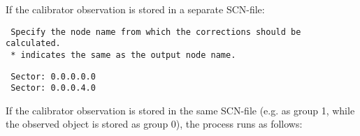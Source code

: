 If the calibrator observation is stored in a separate SCN-file:

\spbegin %
\spend %
%
\spbegin %
\spend %
%
\spbegin %
\suser{\scr}
\spend %
%
\spbegin %
\spend %
%
\spbegin %
\sdefault{= *:}
\svbegin \begin{verbatim}
 Specify the node name from which the corrections should be calculated.
 * indicates the same as the output node name.
\end{verbatim}\svend
\spend %
%
\spbegin %
\sdefault{= *:}
\spend %
%
\spbegin %
\svbegin \begin{verbatim}
 Sector: 0.0.0.0.0
 Sector: 0.0.0.4.0
\end{verbatim}\svend
\spend %

If the calibrator observation is stored in the same SCN-file (e.g. as group 1,
while the observed object is stored as group 0), the process runs as follows:


